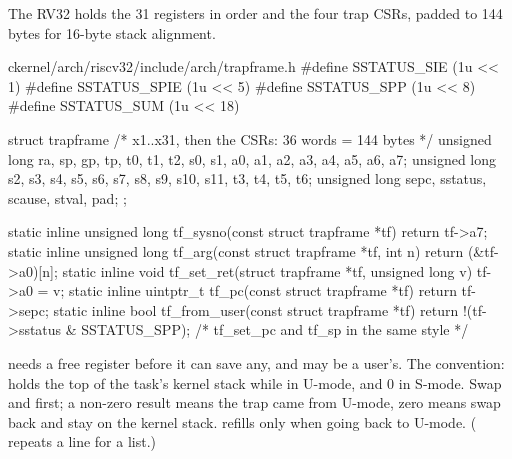 \documentclass[11pt,a4paper]{article}
\begin{document}
The RV32  holds the 31 registers in order and the four trap CSRs, padded to 144 bytes for
16-byte stack alignment.

\begin{lst}{c}{kernel/arch/riscv32/include/arch/trapframe.h}
#define SSTATUS_SIE (1u << 1)
#define SSTATUS_SPIE (1u << 5)
#define SSTATUS_SPP (1u << 8)
#define SSTATUS_SUM (1u << 18)

struct trapframe {                  /* x1..x31, then the CSRs: 36 words = 144 bytes */
    unsigned long ra, sp, gp, tp, t0, t1, t2, s0, s1, a0, a1, a2, a3, a4, a5, a6, a7;
    unsigned long s2, s3, s4, s5, s6, s7, s8, s9, s10, s11, t3, t4, t5, t6;
    unsigned long sepc, sstatus, scause, stval, pad;
};

static inline unsigned long tf_sysno(const struct trapframe *tf)      { return tf->a7; }
static inline unsigned long tf_arg(const struct trapframe *tf, int n) { return (&tf->a0)[n]; }
static inline void tf_set_ret(struct trapframe *tf, unsigned long v)  { tf->a0 = v; }
static inline uintptr_t tf_pc(const struct trapframe *tf)            { return tf->sepc; }
static inline bool tf_from_user(const struct trapframe *tf)          { return !(tf->sstatus & SSTATUS_SPP); }
/* tf_set_pc and tf_sp in the same style */
\end{lst}

 needs a free register before it can save any, and  may be a user's. The convention:
 holds the top of the task's kernel stack while in U-mode, and 0 in S-mode. Swap  and
 first; a non-zero result means the trap came from U-mode, zero means swap back and stay on the kernel
stack.  refills  only when going back to U-mode. ( repeats a line for a
list.)
\end{document}
